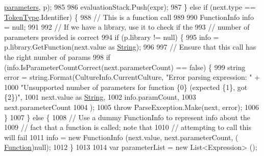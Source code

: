 \begin{DoxyCode}
      \hyperlink{a00104_a7b21380bead8ae08b2cfc6594edab32c}{parameters}, p);
985 
986                         evaluationStack.Push(expr);
987                     \} \textcolor{keywordflow}{else} \textcolor{keywordflow}{if} (next.type == \hyperlink{a00051_a301aa7c866593a5b625a8fc158bbeace}{TokenType}.Identifier) \{
988                         \textcolor{comment}{// This is a function call}
989 
990                         FunctionInfo info = null;
991 
992                         \textcolor{comment}{// If we have a library, use it to check if the}
993                         \textcolor{comment}{// number of parameters provided is correct}
994                         \textcolor{keywordflow}{if} (p.library != null) \{
995                             info = p.library.GetFunction(next.value as \hyperlink{a00051_a301aa7c866593a5b625a8fc158bbeacea27118326006d3829667a400ad23d5d98}{String});
996 
997                             \textcolor{comment}{// Ensure that this call has the right number of params}
998                             \textcolor{keywordflow}{if} (info.IsParameterCountCorrect(next.parameterCount) == \textcolor{keyword}{false}) \{
999                                 \textcolor{keywordtype}{string} error = string.Format(CultureInfo.CurrentCulture, \textcolor{stringliteral}{"Error parsing
       expression: "} +
1000                                     \textcolor{stringliteral}{"Unsupported number of parameters for function \{0\} (expected \{1\}, got
       \{2\})"},
1001                                     next.value as \hyperlink{a00051_a301aa7c866593a5b625a8fc158bbeacea27118326006d3829667a400ad23d5d98}{String},
1002                                     info.paramCount,
1003                                     next.parameterCount
1004                                 );
1005                                 \textcolor{keywordflow}{throw} ParseException.Make(next, error);
1006                             \}
1007                         \} \textcolor{keywordflow}{else} \{
1008                             \textcolor{comment}{// Use a dummy FunctionInfo to represent info about the}
1009                             \textcolor{comment}{// fact that a function is called; note that}
1010                             \textcolor{comment}{// attempting to call this will fail}
1011                             info = \textcolor{keyword}{new} FunctionInfo (next.value, next.parameterCount, (
      \hyperlink{a00051_ae0be2e5cf13d5779816102439e61ff1a}{Function})null);
1012                         \}
1013 
1014                         var parameterList = \textcolor{keyword}{new} List<Expression> ();

\end{DoxyCode}
